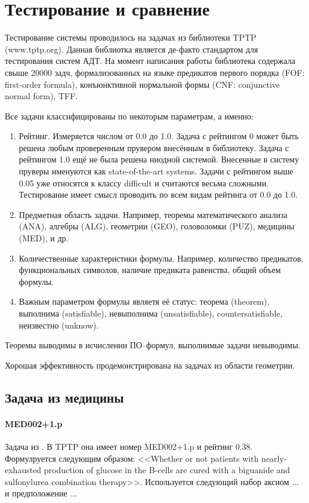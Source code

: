 \section{Тестирование и сравнение}

Тестирование системы проводилось на задачах из библиотеки TPTP (www.tptp.org). Данная библиотка является де-факто стандартом для тестирования систем АДТ. На момент написания работы библиотека содержала свыше 20000 задч, формализованных на языке предикатов первого порядка (FOF: first-order formula), конъюнктивной нормальной формы (CNF: conjunctive normal form), TFF.

Все задачи классифицированы по некоторым параметрам, а именно:
\begin{enumerate}
\item Рейтинг. Измеряется числом от 0.0 до 1.0. Задача с рейтингом 0 может быть решена любым проверенным прувером внесённым в библиотеку. Задача с рейтингом 1.0 ещё не была решена ниодной системой. Внесенные в систему пруверы именуются как state-of-the-art systems. Задачи с рейтингом выше 0.05 уже относятся к классу difficult и считаются весьма сложными. Тестирование имеет смысл проводить по всем видам рейтинга от 0.0 до 1.0.
\item Предметная область задачи. Например, теоремы математического анализа (ANA), алгебры (ALG), геометрии (GEO), головоломки (PUZ), медицины (MED), и др.
\item Количественные характеристики формулы. Например, количество предикатов, функциональных символов, наличие предиката равенства, общий объем формулы.
\item Важным параметром формулы являетя её статус: теорема (theorem), выполнима (satisfiable), невыполнима (unsatisfiable), countersatisfiable, неизвестно (unknow).
\end{enumerate}

Теоремы выводимы в исчислении ПО--формул, выполнимые задачи невыводимы.

Хорошая эффективность продемонстрирована на задачах из области геометрии. 


\subsection{Задача из медицины}
\paragraph{MED002+1.p}
Задача из \cite{med1}. В TPTP она имеет номер MED002+1.p и рейтинг 0.38.
Формулруется следующим образом: <<Whether or not patients with nearly-exhausted production of glucose in the B-cells are cured with a biguanide and sulfonylurea combination therapy>>. Используется следующий набор аксиом ... и предположение ...

